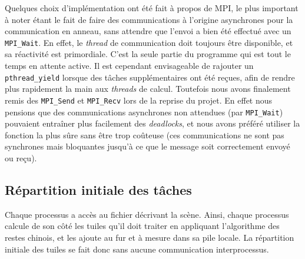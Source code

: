 Quelques choix d'implémentation ont été fait à propos de MPI, le plus important à noter étant le fait de faire des communications à l'origine asynchrones pour la communication en anneau, sans attendre que l'envoi a bien été effectué avec un \texttt{MPI\_Wait}. En effet, le \emph{thread} de communication doit toujours être disponible, et sa réactivité est primordiale. C'est la seule partie du programme qui est tout le temps en attente active. Il est cependant envisageable de rajouter un \texttt{pthread\_yield} lorsque des tâches supplémentaires ont été reçues, afin de rendre plus rapidement la main aux \emph{threads} de calcul. Toutefois nous avons finalement remis des \texttt{MPI\_Send} et \texttt{MPI\_Recv} lors de la reprise du projet. En effet nous pensions que des communications asynchrones non attendues (par \texttt{MPI\_Wait}) pouvaient entraîner plus facilement des \emph{deadlocks}, et nous avons préféré utiliser la fonction la plus sûre sans être trop coûteuse (ces communications ne sont pas synchrones mais bloquantes jusqu'à ce que le message soit correctement envoyé ou reçu).

\subsection{Répartition initiale des tâches}

Chaque processus a accès au fichier décrivant la scène. Ainsi, chaque processus calcule de son côté les tuiles qu'il doit traiter en appliquant l'algorithme des restes chinois, et les ajoute au fur et à mesure dans sa pile locale. La répartition initiale des tuiles se fait donc sans aucune communication interprocessus.
